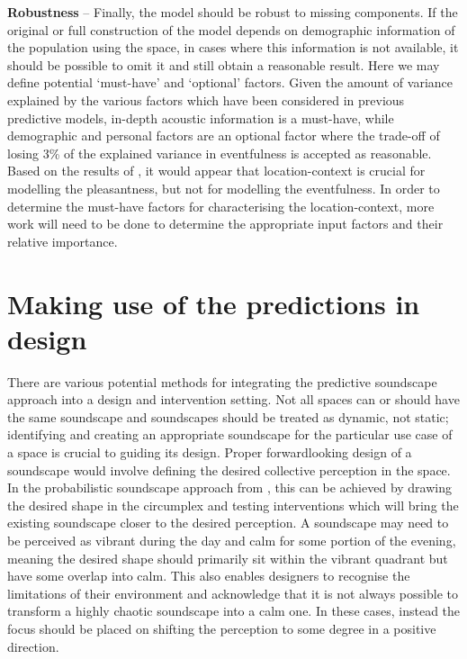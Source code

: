 \documentclass[
  authoryear,
  preprint,
  1p]{elsarticle}
\begin{document}
\textbf{Robustness} -- Finally, the model should be robust to missing
components. If the original or full construction of the model depends on
demographic information of the population using the space, in cases
where this information is not available, it should be possible to omit
it and still obtain a reasonable result. Here we may define potential
`must-have' and `optional' factors. Given the amount of variance
explained by the various factors which have been considered in previous
predictive models, in-depth acoustic information is a must-have, while
demographic and personal factors are an optional factor where the
trade-off of losing 3\% of the explained variance in eventfulness
\citep{Erfanian2021Psychological} is accepted as reasonable. Based on
the results of \citet{Mitchell2021Investigating}, it would appear that
location-context is crucial for modelling the pleasantness, but not for
modelling the eventfulness. In order to determine the must-have factors
for characterising the location-context, more work will need to be done
to determine the appropriate input factors and their relative
importance.

\section{Making use of the predictions in
design}\label{making-use-of-the-predictions-in-design}

There are various potential methods for integrating the predictive
soundscape approach into a design and intervention setting. Not all
spaces can or should have the same soundscape and soundscapes should be
treated as dynamic, not static; identifying and creating an appropriate
soundscape for the particular use case of a space is crucial to guiding
its design. Proper forwardlooking design of a soundscape would involve
defining the desired collective perception in the space. In the
probabilistic soundscape approach from \citet{Mitchell2022How}, this can
be achieved by drawing the desired shape in the circumplex and testing
interventions which will bring the existing soundscape closer to the
desired perception. A soundscape may need to be perceived as vibrant
during the day and calm for some portion of the evening, meaning the
desired shape should primarily sit within the vibrant quadrant but have
some overlap into calm. This also enables designers to recognise the
limitations of their environment and acknowledge that it is not always
possible to transform a highly chaotic soundscape into a calm one. In
these cases, instead the focus should be placed on shifting the
perception to some degree in a positive direction.
\end{document}
